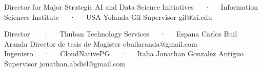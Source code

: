 \begin{cventries}
   \cventry
   {Director for Major Strategic AI and Data Science Initiatives~~~·~~~Information Sciences Institute~~~·~~~USA} %
   {Yolanda Gil} %
   {Supervisor} %
   {gil@isi.edu} %
   {} %
   {}

   \vspace{1.0mm}
   \cventry
   {Director ~~~·~~~Thuban Technology Services~~~·~~~Espana} %
   {Carlos Buil Aranda} %
   {Director de tesis de Magister} %
   {cbuilaranda@gmail.com} %
   {} %
   {}
   \vspace{2.0mm}
   \cventry
   {Ingeniero~~~·~~~CloudNativePG~~~·~~~Italia} %
   {Jonathan Gonzalez} %
   {Antiguo Supervisor} %
   {jonathan.abdiel@gmail.com} %
   {} %
\end{cventries}